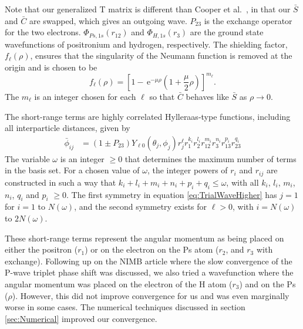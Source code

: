 \documentclass[preprint,showpacs,preprintnumbers,amsmath,amssymb]{revtex4}
\newcommand{\ee} {\,\text{e}}
\begin{document}
Note that our generalized T matrix is different than Cooper et al.\ \cite{Cooper2010}, in that our $\bar{S}$ and $\bar{C}$ are swapped, which gives an outgoing wave.  $P_{23}$ is the exchange operator for the two electrons. $\Phi_{Ps,1s}\left(r_{12}\right)$ and $\Phi_{H,1s}\left(r_3\right)$ are the ground state wavefunctions of positronium and hydrogen, respectively. The shielding factor, $f_\ell(\rho)$, ensures that the singularity of the Neumann function is removed at the origin and is chosen to be
\begin{equation}
f_\ell(\rho) = \left[1 - \ee^{-\mu \rho} \left(1+\frac{\mu}{2}\rho\right)\right]^{m_\ell}.
\label{eq:PartialWaveShielding}
\end{equation}
The $m_\ell$ is an integer chosen for each $\ell$ so that $\bar{C}$ behaves like $\bar{S}$ as $\rho \rightarrow 0$.

The short-range terms are highly correlated Hylleraas-type functions, including all interparticle distances, given by
\begin{subequations}
\label{eq:PhiDef}
\begin{align}
\bar{\phi}_{ij} &= \left(1 \pm P_{23}\right) Y_{\ell 0}(\theta_j,\phi_j) r_j^{\ell} r_1^{k_i} r_2^{l_i} r_{12}^{m_i} r_3^{n_i} r_{13}^{p_i} r_{23}^{q_i} \label{eq:PartialWavePhi}
\end{align}
\end{subequations}
The variable $\omega$ is an integer $\geq 0$ that determines the maximum number of terms in the basis set.  For a chosen value of $\omega$, the integer powers of $r_i$ and $r_{ij}$ are constructed in such a way that $k_i + l_i + m_i + n_i + p_i + q_i \leq \omega$, with all $k_i$, $l_i$, $m_i$, $n_i$, $q_i$ and $p_i$ $\geq 0$. The first symmetry in equation \ref{eq:TrialWaveHigher} has $j = 1$ for $i=1$ to $N(\omega)$, and the second symmetry exists for $\ell > 0$, with $i = N(\omega)$ to $2N(\omega)$.

These short-range terms represent the angular momentum as being placed on either the positron ($r_1$) or on the electron on the Ps atom ($r_2$, and $r_3$ with exchange).
Following up on the NIMB article \cite{VanReeth2004} where the slow convergence of the P-wave triplet phase shift was discussed, we also tried a wavefunction where the angular momentum was placed on the electron of the H atom ($r_3$) and on the Ps ($\rho$). However, this did not improve convergence for us and was even marginally worse in some cases. The numerical techniques discussed in section \ref{sec:Numerical} improved our convergence.
\end{document}
